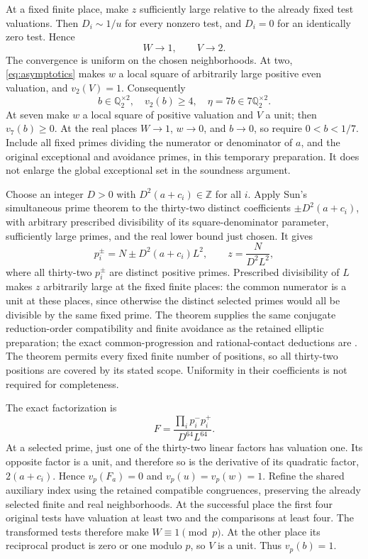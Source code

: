 \documentclass[11pt,a4paper]{article}
\newcommand{\Q}{\mathbb Q}\newcommand{\Z}{\mathbb Z}
\begin{document}
At a fixed finite place, make $z$ sufficiently large relative to the
already fixed test valuations. Then $D_i\sim1/u$ for every nonzero
test, and $D_i=0$ for an identically zero test. Hence
\[
                       W\longrightarrow1,\qquad V\longrightarrow2.
\]
The convergence is uniform on the chosen neighborhoods.
At two, \eqref{eq:asymptotics} makes $w$ a local square of arbitrarily
large positive even valuation, and $v_2(V)=1$. Consequently
\[
 b\in\Q_2^{\times2},\quad v_2(b)\ge4,\quad
 \eta=7b\in7\Q_2^{\times2}.
\]
At seven make $w$ a local square of positive valuation and $V$ a unit;
then $v_7(b)\ge0$. At the real places $W\to1$, $w\to0$, and
$b\to0$, so require $0<b<1/7$. Include all fixed primes dividing
the numerator or denominator of $a$, and the original exceptional
and avoidance primes, in this temporary preparation. It does not
enlarge the global exceptional set in the soundness argument.

Choose an integer $D>0$ with $D^2(a+c_i)\in\Z$ for all $i$.
Apply Sun's simultaneous prime theorem \cite[Theorem 4.1]{Sun} to
the thirty-two distinct coefficients $\pm D^2(a+c_i)$, with arbitrary
prescribed divisibility of its square-denominator parameter, sufficiently
large primes, and the real lower bound just chosen. It gives
\[
 p_i^\pm=N\pm D^2(a+c_i)L^2,\qquad
                         z=\frac{N}{D^2L^2},
\]
where all thirty-two $p_i^\pm$ are distinct positive primes.
Prescribed divisibility of $L$ makes $z$ arbitrarily large at the
fixed finite places: the common numerator is a unit at these places,
since otherwise the distinct selected primes would all be divisible
by the same fixed prime. The theorem supplies the same conjugate
reduction-order compatibility and finite avoidance as the retained
elliptic preparation; the exact common-progression and rational-contact
deductions are \cite[Section 2]{Dependencies}. The theorem permits
every fixed finite number of positions, so all thirty-two positions
are covered by its stated scope. Uniformity in their coefficients is
not required for completeness.

The exact factorization is
\begin{equation}\label{eq:primefactorization}
                    F=\frac{\prod_i p_i^-p_i^+}{D^{64}L^{64}}.
\end{equation}
At a selected prime, just one of the thirty-two linear factors has
valuation one. Its opposite factor is a unit, and therefore so is
the derivative of its quadratic factor, $2(a+c_i)$. Hence
$v_p(F_a)=0$ and $v_p(u)=v_p(w)=1$.
Refine the shared auxiliary index using the retained compatible
congruences, preserving the already selected finite and real neighborhoods.
At the successful place the first four original tests have valuation
at least two and the comparisons at least four. The transformed tests
therefore make $W\equiv1\pmod p$.
At the other place its reciprocal product is zero or one modulo $p$,
so $V$ is a unit. Thus $v_p(b)=1$.
\end{document}
